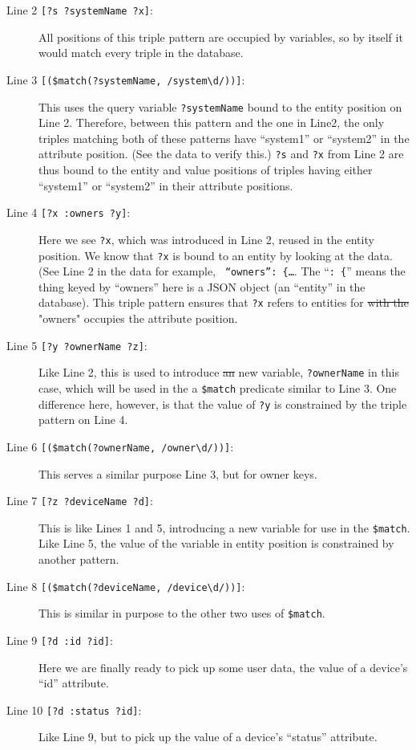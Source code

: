 \documentclass[10pt,letterpaper]{article} %
\newcommand{\stt}[1]{\texttt{#1}} %
\providecommand{\DIFadd}[1]{{\protect\color{blue}\uwave{#1}}} %
\providecommand{\DIFdel}[1]{{\protect\color{red}\sout{#1}}}                      %
\providecommand{\DIFaddbegin}{} %
\providecommand{\DIFaddend}{} %
\providecommand{\DIFdelbegin}{} %
\providecommand{\DIFdelend}{} %
\newcommand{\DIFscaledelfig}{0.5}
\newlength{\DIFdelgraphicswidth} %
\newlength{\DIFdelgraphicsheight} %
\newcommand{\DIFaddincludegraphics}[2][]{{\color{blue}\fbox{\DIFOincludegraphics[#1]{#2}}}} %
\newcommand{\DIFdelincludegraphics}[2][]{%
\sbox{\DIFdelgraphicsbox}{\DIFOincludegraphics[#1]{#2}}%
\settoboxwidth{\DIFdelgraphicswidth}{\DIFdelgraphicsbox} %
\settoboxtotalheight{\DIFdelgraphicsheight}{\DIFdelgraphicsbox} %
\scalebox{\DIFscaledelfig}{%
\parbox[b]{\DIFdelgraphicswidth}{\usebox{\DIFdelgraphicsbox}\\[-\baselineskip] \rule{\DIFdelgraphicswidth}{0em}}\llap{\resizebox{\DIFdelgraphicswidth}{\DIFdelgraphicsheight}{%
\setlength{\unitlength}{\DIFdelgraphicswidth}%
\begin{picture}(1,1)%
\thicklines\linethickness{2pt} %
{\color[rgb]{1,0,0}\put(0,0){\framebox(1,1){}}}%
{\color[rgb]{1,0,0}\put(0,0){\line( 1,1){1}}}%
{\color[rgb]{1,0,0}\put(0,1){\line(1,-1){1}}}%
\end{picture}%
}\hspace*{3pt}}} %
} %
\DeclareRobustCommand{\DIFaddbegin}{\DIFOaddbegin \let\includegraphics\DIFaddincludegraphics} %
\DeclareRobustCommand{\DIFaddend}{\DIFOaddend \let\includegraphics\DIFOincludegraphics} %
\DeclareRobustCommand{\DIFdelbegin}{\DIFOdelbegin \let\includegraphics\DIFdelincludegraphics} %
\DeclareRobustCommand{\DIFdelend}{\DIFOaddend \let\includegraphics\DIFOincludegraphics} %
\begin{document}
\begin{description}
\item[Line 2 \stt{[?s ?systemName ?x]}:] All positions of this triple pattern are occupied by variables, so by itself it would match every triple in the database.
\item[Line 3 \stt{[(\$match(?systemName, /system\textbackslash d/))]}:] This uses the query variable \stt{?systemName} bound to the entity position on Line 2.
  Therefore, between this pattern and the one in Line2, the only triples matching both of these patterns have ``system1'' or ``system2'' in the attribute position. (See the data to verify this.)
  \stt{?s} and \stt{?x} from Line 2 are thus bound to the entity and value positions of triples having either ``system1'' or ``system2'' in their attribute positions.
\item[Line 4 \stt{[?x :owners ?y]}:] Here we see \stt{?x}, which was introduced in Line 2, reused in the entity position.
  We know that \stt{?x} is bound to an entity by looking at the data.
  (See Line 2 in the data for example, \stt{ ``owners'': \{\ldots}. The ``\stt{: \{}'' means the thing keyed by ``owners'' here is a JSON object (an ``entity'' in the database).
  This triple pattern ensures that \stt{?x} refers to entities for \DIFdelbegin \DIFdel{with the }\DIFdelend \DIFaddbegin \DIFadd{which }\DIFaddend "owners" occupies the attribute position.
\item[Line 5 \stt{[?y ?ownerName ?z]}:]  Like Line 2, this is used to introduce \DIFdelbegin \DIFdel{an }\DIFdelend \DIFaddbegin \DIFadd{a }\DIFaddend new variable, \stt{?ownerName} in this case, which will be used in the a \stt{\$match} predicate similar to Line 3.
  One difference here, however, is that the value of \stt{?y} is constrained by the triple pattern on Line 4.
\item[Line 6 \stt{[(\$match(?ownerName, /owner\textbackslash d/))]}:] This serves a similar purpose Line 3, but for owner keys.
\item[Line 7 \stt{[?z ?deviceName ?d]}:] This is like Lines 1 and 5, introducing a new variable for use in the \stt{\$match}.
  Like Line 5, the value of the variable in entity position is constrained by another pattern.
\item[Line 8 \stt{[(\$match(?deviceName, /device\textbackslash d/))]}:] This is similar in purpose to the other two uses of \stt{\$match}.
\item[Line 9 \stt{[?d :id ?id]}:] Here we are finally ready to pick up some user data, the value of a device's ``id'' attribute.
\item[Line 10 \stt{[?d :status ?id]}:] Like Line 9, but to pick up the value of a device's ``status'' attribute.
\end{description}
\end{document}
